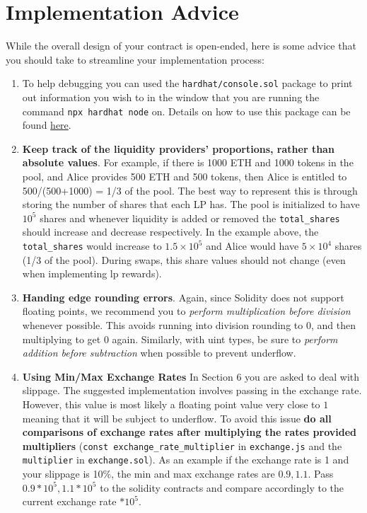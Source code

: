 \documentclass[11pt]{article}
\begin{document}
\section{Implementation Advice}
While the overall design of your contract is open-ended, here is some advice that you should take to streamline your implementation process:
\begin{enumerate}
    \item To help debugging you can used the \texttt{hardhat/console.sol} package to print out information you wish to in the window that you are running the command \texttt{npx hardhat node} on. Details on how to use this package can be found \hyperlink{https://hardhat.org/tutorial/debugging-with-hardhat-network}{here}.
    \item \textbf{Keep track of the liquidity providers' proportions, rather than absolute values}. For example, if there is 1000 ETH and 1000 tokens in the pool, and Alice provides 500 ETH and 500 tokens, then Alice is entitled to 500/(500+1000) = 1/3 of the pool. The best way to represent this is through storing the number of shares that each LP has. The pool is initialized to have $10^{5}$ shares and whenever liquidity is added or removed the \texttt{total\_shares} should increase and decrease respectively. In the example above, the \texttt{total\_shares} would increase to $1.5 \times 10^5$ and Alice would have $5 \times 10^4$ shares (1/3 of the pool). During swaps, this share values should not change (even when implementing lp rewards).
    \item \textbf{Handing edge rounding errors}. Again, since Solidity does not support floating points, we recommend you to \textit{perform multiplication before division} whenever possible. This avoids running into division rounding to 0, and then multiplying to get 0 again. Similarly, with uint types, be sure to \textit{perform addition before subtraction} when possible to prevent underflow. 

    \item \textbf{Using Min/Max Exchange Rates} In Section 6 you are asked to deal with slippage. The suggested implementation involves passing in the exchange rate. However, this value is most likely a floating point value very close to $1$ meaning that it will be subject to underflow. To avoid this issue \textbf{do all comparisons of exchange rates after multiplying the rates provided multipliers} (\texttt{const exchange\_rate\_multiplier} in \texttt{exchange.js} and the \texttt{multiplier} in \texttt{exchange.sol}).  As an example if the exchange rate is 1 and your slippage is 10\%, the min and max exchange rates are $0.9, 1.1$. Pass $0.9 * 10^5, 1.1 * 10^5$ to the solidity contracts and compare accordingly to the current exchange rate $* 10^5$.
    

\end{enumerate}
\end{document}
